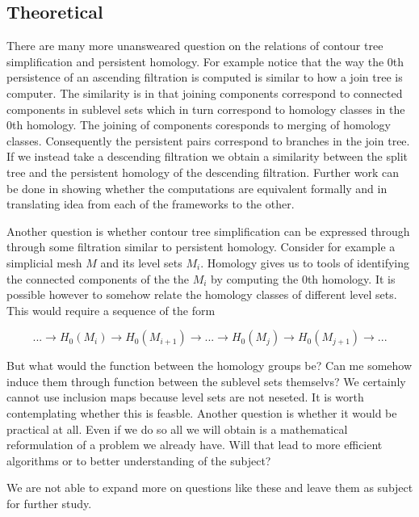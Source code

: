 \subsection{Theoretical}

There are many more unansweared question on the relations of contour tree simplification and persistent homology. For example notice that the way the 0th persistence of an ascending filtration is computed is similar to how a join tree is computer. The similarity is in that joining components correspond to connected components in sublevel sets which in turn correspond to homology classes in the 0th homology. The joining of components coresponds to merging of homology classes. Consequently the persistent pairs correspond to branches in the join tree. If we instead take a descending filtration we obtain a similarity between the split tree and the persistent homology of the descending filtration. Further work can be done in showing whether the computations are equivalent formally and in translating idea from each of the frameworks to the other.

Another question is whether contour tree simplification can be expressed through through some filtration similar to persistent homology. Consider for example a simplicial mesh $M$ and its level sets $M_i$. Homology gives us to tools of identifying the connected components of the the $M_i$ by computing the 0th homology. It is possible however to somehow relate the homology classes of different level sets. This would require a sequence of the form

$$ ... \rightarrow H_0(M_i) \rightarrow H_0(M_{i+1}) \rightarrow ... \rightarrow H_0(M_{j}) \rightarrow H_0(M_{j+1}) \rightarrow ...$$

But what would the function between the homology groups be? Can me somehow induce them through function between the sublevel sets themselvs? We certainly cannot use inclusion maps because level sets are not neseted. It is worth contemplating whether this is feasble. Another question is whether it would be practical at all. Even if we do so all we will obtain is a mathematical reformulation of a problem we already have. Will that lead to more efficient algorithms or to better understanding of the subject?

We are not able to expand more on questions like these and leave them as subject for further study.






%
%
